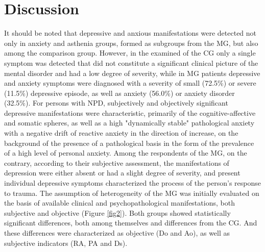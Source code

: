 \documentclass[twocolumn]{article}
\begin{document}
\section{Discussion}
\par It should be noted that depressive and anxious manifestations were detected not only in anxiety and asthenia groups, formed as subgroups from the MG, but also among the comparison group. However, in the examined of the CG only a single symptom was detected that did not constitute a significant clinical picture of the mental disorder and had a low degree of severity, while in MG patients depressive and anxiety symptoms were diagnosed with a severity of small (72.5\%) or severe (11.5\%) depressive episode, as well as anxiety (56.0\%) or anxiety disorder (32.5\%). For persons with NPD, subjectively and objectively significant depressive manifestations were characteristic, primarily of the cognitive-affective and somatic spheres, as well as a high "dynamically stable" pathological anxiety with a negative drift of reactive anxiety in the direction of increase, on the background of the presence of a pathological basis in the form of the prevalence of a high level of personal anxiety. Among the respondents of the MG, on the contrary, according to their subjective assessment, the manifestations of depression were either absent or had a slight degree of severity, and present individual depressive symptoms characterized the process of the person's response to trauma. The assumption of heterogeneity of the MG was initially evaluated on the basis of available clinical and psychopathological manifestations, both subjective and objective (Figure \ref{fig2}). Both groups showed statistically significant differences, both among themselves and differences from the CG. And these differences were characterized as objective (Do and Ao), as well as subjective indicators (RA, PA and Ds).
\end{document}
